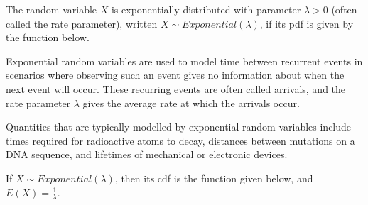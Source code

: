 \begin{defn}The random variable $X$ is exponentially distributed with parameter $\lambda > 0$ (often called the rate parameter), written $X \sim Exponential(\lambda)$, if its pdf is given by the function below.

\vspace{-1em}
\begin{center}
    \begin{minipage}{.5\textwidth}
        \centering
      \renewcommand*{\arraystretch}{1.35}
\renewcommand*{\arraystretch}{1}
\vspace{1em}
    \end{minipage}%
    \begin{minipage}{0.5\textwidth}
        \centering
{}
\end{minipage}
\end{center}

\end{defn}
\par
Exponential random variables are used to model time between recurrent events in scenarios where observing such an event gives no information about when the next event will occur. These recurring events are often called arrivals, and the rate parameter $\lambda$ gives the average rate at which the arrivals occur.
\par
Quantities that are typically modelled by exponential random variables include times required for radioactive atoms to decay, distances between mutations on a DNA sequence, and lifetimes of mechanical or electronic devices.
\par
\begin{prop}If $X \sim Exponential(\lambda)$, then its cdf is the function given below, and $E(X) = \frac{1}{\lambda}$.
\renewcommand*{\arraystretch}{1.35}
\renewcommand*{\arraystretch}{1}
\end{prop}
